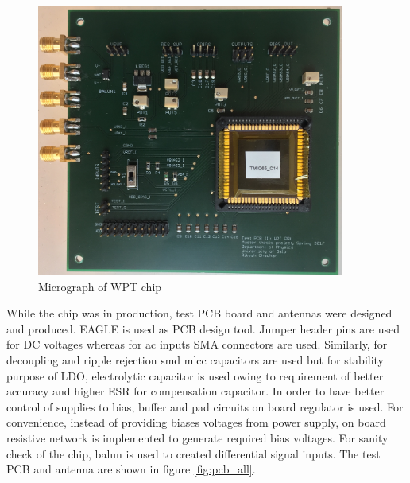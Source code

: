 \documentclass[UKenglish]{ifimaster}  %
\begin{document}
\begin{figure} [H]
  \centering
  \includegraphics[width=0.9\textwidth]{img/pcb/test_pcb.JPG} 
 \caption{Micrograph of WPT chip} 
\label{fig:micrograph} 
\end{figure}


While the chip was in production, test PCB board and antennas were designed and produced. EAGLE is used as PCB design tool. Jumper header pins are used for DC voltages whereas for ac inputs SMA connectors are used. Similarly, for decoupling and ripple rejection \acrshort{smd} \acrshort{mlcc} capacitors are used but  for stability purpose of LDO, electrolytic capacitor is used owing to requirement of better accuracy and higher ESR for compensation capacitor.  In order to have better control of supplies to bias, buffer and pad circuits on board regulator is used. For convenience, instead of providing biases voltages from power supply, on board resistive network is implemented to generate required bias voltages. For sanity check of the chip, balun is used to created differential signal inputs. The test PCB and antenna are shown in figure \ref{fig:pcb_all}.\\
\end{document}

